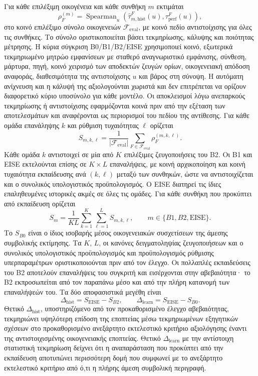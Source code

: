 \documentclass[11pt,a4paper]{article}
\begin{document}
Για κάθε επιλέξιμη οικογένεια και κάθε συνθήκη $m$ εκτιμάται
\[
\rho_F^{(m)}=\operatorname{Spearman}_{u}\!\left(
\widehat\tau_{m,\mathrm{hist}}^F(u),
\tau_{\mathrm{perf}}^F(u)
\right),
\]
στο κοινό επιλέξιμο σύνολο οικογενειών $\mathcal F_{\mathrm{eval}}$, με κοινό πεδίο αντιστοίχισης για όλες τις συνθήκες. Το σύνολο οριστικοποιείται βάσει τεκμηρίωσης, κάλυψης και ποιότητας μέτρησης. Η κύρια σύγκριση B0/B1/B2/EISE χρησιμοποιεί κοινό, εξωτερικά τεκμηριωμένο μητρώο εμφανίσεων με σταθερό αναγνωριστικό εμφάνισης, σύνθεση, μάρτυρα, πηγή, κοινό χειρισμό των αποδεκτών ζευγών ορίων, οικογενειακή απόδοση αναφοράς, διαθεσιμότητα της αντιστοίχισης $u$ και βάρος στη σύνοψη. Η αυτόματη ανίχνευση και η κάλυψή της αξιολογούνται χωριστά και δεν επιτρέπεται να ορίζουν διαφορετικό κύριο υποσύνολο για κάθε μοντέλο. Οι αποκλεισμοί λόγω ανεπαρκούς τεκμηρίωσης ή αντιστοίχισης εφαρμόζονται κοινά πριν από την εξέταση των αποτελεσμάτων και αναφέρονται ως περιορισμοί του πεδίου της αντίθεσης. Για κάθε ομάδα επανάληψης $k$ και ρύθμιση τυχαιότητας $\ell$ ορίζεται
\[
S_{m,k,\ell}=\frac{1}{|\mathcal F_{\mathrm{eval}}|}
\sum_{F\in\mathcal F_{\mathrm{eval}}}\rho_F^{(m,k,\ell)}.
\]
Κάθε ομάδα $k$ αντιστοιχεί σε μία από $K$ επιλέξιμες ζευγοποιήσεις του B2. Οι B1 και EISE εκτελούνται επίσης σε $K\times L$ επαναλήψεις, με κοινή αρχικοποίηση και κοινή τυχαιότητα εκπαίδευσης ανά $(k,\ell)$ μεταξύ των συνθηκών, ώστε να αντιστοιχίζεται και ο συνολικός υπολογιστικός προϋπολογισμός. Ο EISE διατηρεί τις ίδιες επαληθευμένες ιστορικές ακμές σε όλες τις ομάδες. Για κάθε συνθήκη που προκύπτει από εκπαίδευση ορίζεται
\[
S_m=\frac{1}{KL}\sum_{k=1}^{K}\sum_{\ell=1}^{L}S_{m,k,\ell},
\qquad m\in\{B1,B2,\mathrm{EISE}\}.
\]
Το $S_{B0}$ είναι ο ίδιος ισοβαρής μέσος οικογενειακών συσχετίσεων της άμεσης συμβολικής εκτίμησης. Τα $K$, $L$, οι κανόνες δειγματοληψίας ζευγοποιήσεων και ο συνολικός υπολογιστικός προϋπολογισμός και προϋπολογισμός ρύθμισης υπερπαραμέτρων οριστικοποιούνται πριν από τον έλεγχο. Οι πολλαπλές εκπαιδεύσεις του B2 αποτελούν επαναλήψεις του συγκριτή και εισέρχονται στην αβεβαιότητα· το B2 εκπροσωπείται από τον παραπάνω μέσο και από την πλήρη κατανομή των επαναλήψεών του. Τα δύο αποφασιστικά μεγέθη είναι
\[
\Delta_{\mathrm{hist}}=S_{\mathrm{EISE}}-S_{B2},
\qquad
\Delta_{\mathrm{learn}}=S_{\mathrm{EISE}}-S_{B0}.
\]
Θετικό $\Delta_{\mathrm{hist}}$, υποστηριζόμενο από τον προκαθορισμένο έλεγχο αβεβαιότητας, τεκμηριώνει υψηλότερη επίδοση της εποπτείας μέσω τεκμηριωμένων εξηγητικών σχέσεων στο προκαθορισμένο ανεξάρτητο εκτελεστικό κριτήριο αξιολόγησης έναντι της αντιστοιχισμένης οικογενειακής εποπτείας. Θετικό $\Delta_{\mathrm{learn}}$ με την αντίστοιχη στατιστική τεκμηρίωση δείχνει ότι η αναπαράσταση που προκύπτει από την εκπαίδευση αποτυπώνει περισσότερη δομή που συμφωνεί με το ανεξάρτητο εκτελεστικό κριτήριο από ό,τι η πλήρης άμεση συμβολική περιγραφή.
\end{document}
